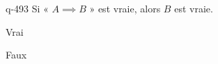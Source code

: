 \begin{truefalse}{q-493}
Si « $A \implies B$ » est vraie, alors $B$ est vraie.
\item Vrai
\item* Faux
\end{truefalse}

